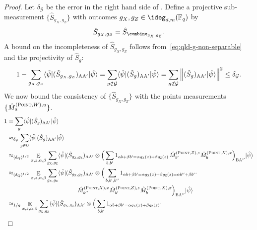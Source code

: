 \documentclass[11pt]{article}
\theoremstyle{definition}
\newcommand{\ket}[1]{|#1\rangle}
\newcommand{\bra}[1]{\langle#1|}
\newcommand{\F}{\ensuremath{\mathbb{F}}}
\newcommand{\mG}{\ensuremath{\mathcal{G}}}
\newcommand{\norm}[1]{\left\| {#1} \right\|}
\newcommand{\E}{\mathop{\mathbb{E}}\displaylimits}
\newcommand{\labelstyle}[1]{\ensuremath{\textsc{#1}}\xspace}
\newcommand{\xpt}{\labelstyle{X}}
\newcommand{\zpt}{\labelstyle{Z}}
\newcommand{\alice}{\labelstyle{A}}
\newcommand{\bob}{\labelstyle{B}}
\newcommand{\typestyle}[1]{\ensuremath{\textsc{#1}}\xspace}
\newcommand{\Point}{\typestyle{Point}}
\begin{document}
\begin{proof}
	Let $\delta_{\mathcal{G}}$ be the error in the right hand side of . Define a projective sub-measurement $\{\hat{S}_{g_X, g_Z}\}$ with outcomes $g_X, g_Z \in \ideg_{d,m}(\F_q)$ by
        \begin{equation}
          \hat{S}_{g_X, g_Z} = \hat{S}_{\combine_{g_X, g_Z}}.
        \end{equation}
        A bound on the incompleteness of $\hat{S}_{g_X, g_Z}$ follows from~\eqref{eq:qld-g-non-separable} and the projectivity of $\hat{S}_g$:
        \begin{equation} 1 - \sum_{g_X, g_Z} \bra{\hat{\psi}} (\hat{S}_{g_X, g_Z})_{\alice \alice'} \ket{\hat{\psi}} = \sum_{g \notin \mathcal{G}} \bra{\hat{\psi}} (\hat{S}_g)_{\alice \alice'} \ket{\hat{\psi}} = \sum_{g \notin \mathcal{G}} \norm{ (\hat{S}_g)_{\alice \alice'} \ket{\hat{\psi}} }^2 \leq\delta _{\mG}. \label{eq:qld-sgg-completeness} \end{equation}
        We now bound the consistency of $\{\hat{S}_{g_X, g_Z}\}$ with the points measurements $\{\hat{M}^{(\Point, W), u}_{a}\}$.
	\begin{align}
		1 &= \sum_g\bra{\hat{\psi}}  (\hat{S}_g)_{\alice \alice'} \ket{\hat{\psi}} \label{eq:qld-s-good-and-bad} \\
		&\approx_{\delta_{\mG}} \sum_{g \in \mathcal{G}} \bra{\hat{\psi}} (\hat{S}_g)_{\alice \alice'} \ket{\hat{\psi}} \label{eq:qld-s-good-g}\\
                  &\approx_{(\delta_Q)^{1/2}} \E_{x,z,\alpha,\beta} \sum_{g_\xpt, g_\zpt}\bra{\hat{\psi}}  (\hat{S}_{g_\xpt,g_\zpt})_{\alice \alice'} \otimes \Big ( \sum_{b,b'} 1_{\alpha b + \beta b' = \alpha g_\xpt (x) + \beta g_\zpt(z)} \, \hat{M}^{(\Point,Z),z}_{b'} \hat{M}^{(\Point,X),x}_{b} \Big)_{\bob \alice''} \ket{\hat{\psi}} \label{eq:qld-s-mm}\\
                  &\approx _{(\delta_Q)^{1/2}} \E_{x,z,\alpha,\beta} \sum_{g_\xpt, g_\zpt}\bra{\hat{\psi}}  (\hat{S}_{g_\xpt,g_\zpt})_{\alice \alice'} \otimes \Big ( \sum_{b,b', b''} 1_{\alpha b + \beta b' = \alpha g_\xpt (x) + \beta g_\zpt(z) = \alpha b'' + \beta b'} \cdot\, \notag \\
          &\hspace{12em} \hat{M}^{(\Point, X), x}_{b''} \hat{M}^{(\Point,Z),z}_{b'} \hat{M}^{(\Point,X),x}_{b} \Big)_{\bob \alice''} \ket{\hat{\psi}} \label{eq:qld-s-mmm} \\
      &\approx _{1/q} \E_{x,z,\alpha,\beta} \sum_{g_\xpt, g_\zpt}\bra{\hat{\psi}}  (\hat{S}_{g_\xpt,g_\zpt})_{\alice \alice'} \otimes \Big ( \sum_{b,b'} 1_{\alpha b + \beta b' = \alpha g_\xpt (x) + \beta g_\zpt(z) } \cdot \,\notag\\

\end{align}
\end{proof}
\end{document}

